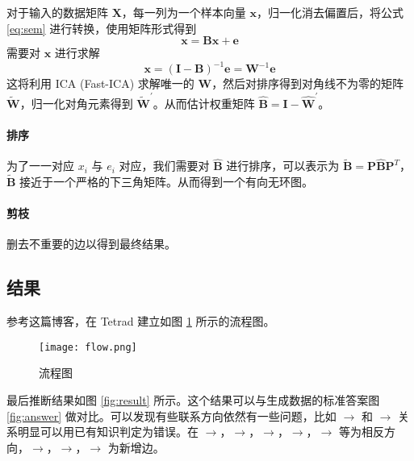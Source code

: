     对于输入的数据矩阵 $\mathbf{X}$，每一列为一个样本向量 $\mathbf{x}$，归一化消去偏置后，将公式 \eqref{eq:sem} 进行转换，使用矩阵形式得到
    \begin{equation}
        \mathbf{x} = \mathbf{B}\mathbf{x} + \mathbf{e}
    \end{equation}
    需要对 $\mathbf{x}$ 进行求解
    \begin{equation}
        \mathbf{x} = (\mathbf{I} - \mathbf{B})^{-1}\mathbf{e} = \mathbf{W}^{-1}\mathbf{e}
    \end{equation}
    这将利用 ICA (Fast-ICA) 求解唯一的 $\mathbf{W}$，然后对排序得到对角线不为零的矩阵 $\tilde{\mathbf{W}}$，归一化对角元素得到 $\tilde{\mathbf{W}}^\prime$。从而估计权重矩阵 $\hat{\mathbf{B}} = \mathbf{I}-\hat{\mathbf{W}}^\prime$。

    \paragraph{排序}

    为了一一对应 $x_i$ 与 $e_i$ 对应，我们需要对 $\hat{\mathbf{B}}$ 进行排序，可以表示为 $\tilde{\mathbf{B}} = \mathbf{P}\hat{\mathbf{B}}\mathbf{P}^T$，$\tilde{\mathbf{B}}$ 接近于一个严格的下三角矩阵。从而得到一个有向无环图。

    \paragraph{剪枝}

    删去不重要的边以得到最终结果。

    \subsection{结果}

    参考这篇博客\cite{draw}，在 Tetrad \cite{tetrad} 建立如图 \ref{fig:flow} 所示的流程图。

    \begin{figure}[ht]
        \centering
        \texttt{[image: flow.png]}
        \caption{流程图}\label{fig:flow}
    \end{figure}
    
    最后推断结果如图 \ref{fig:result} 所示。这个结果可以与生成数据的标准答案图 \ref{fig:answer} 做对比。可以发现有些联系方向依然有一些问题，比如
    $\rightarrow$ 和 $\rightarrow$
    关系明显可以用已有知识判定为错误。在 $\rightarrow$，$\rightarrow$，$\rightarrow$，$\rightarrow$，$\rightarrow$ 等为相反方向，$\rightarrow$，$\rightarrow$，$\rightarrow$ 为新增边。


